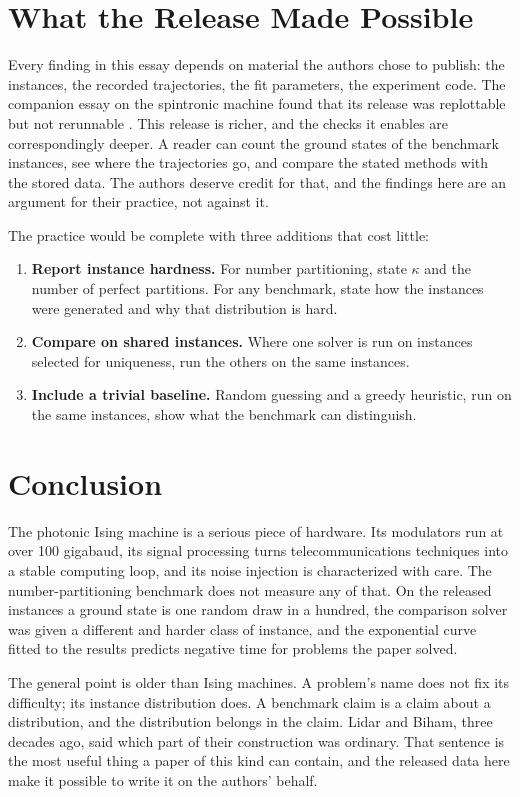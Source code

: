 \documentclass[11pt]{article}
\theoremstyle{definition}
\theoremstyle{remark}
\begin{document}
\section{What the Release Made Possible}

Every finding in this essay depends on material the authors chose to publish: the instances, the recorded trajectories, the fit parameters, the experiment code. The companion essay on the spintronic machine found that its release was replottable but not rerunnable \cite{flyxion-replot}. This release is richer, and the checks it enables are correspondingly deeper. A reader can count the ground states of the benchmark instances, see where the trajectories go, and compare the stated methods with the stored data. The authors deserve credit for that, and the findings here are an argument for their practice, not against it.

The practice would be complete with three additions that cost little:
\begin{enumerate}
\item \textbf{Report instance hardness.} For number partitioning, state $\kappa$ and the number of perfect partitions. For any benchmark, state how the instances were generated and why that distribution is hard.
\item \textbf{Compare on shared instances.} Where one solver is run on instances selected for uniqueness, run the others on the same instances.
\item \textbf{Include a trivial baseline.} Random guessing and a greedy heuristic, run on the same instances, show what the benchmark can distinguish.
\end{enumerate}

\section{Conclusion}

The photonic Ising machine is a serious piece of hardware. Its modulators run at over 100 gigabaud, its signal processing turns telecommunications techniques into a stable computing loop, and its noise injection is characterized with care. The number-partitioning benchmark does not measure any of that. On the released instances a ground state is one random draw in a hundred, the comparison solver was given a different and harder class of instance, and the exponential curve fitted to the results predicts negative time for problems the paper solved.

The general point is older than Ising machines. A problem's name does not fix its difficulty; its instance distribution does. A benchmark claim is a claim about a distribution, and the distribution belongs in the claim. Lidar and Biham, three decades ago, said which part of their construction was ordinary. That sentence is the most useful thing a paper of this kind can contain, and the released data here make it possible to write it on the authors' behalf.
\end{document}
